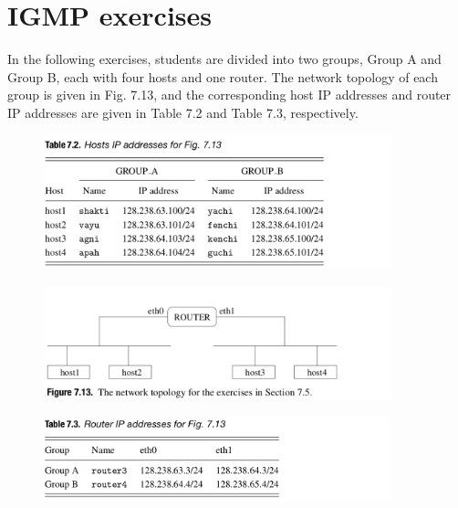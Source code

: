\documentclass[10pt,a4paper]{article}
\numberwithin{equation}{section}
\numberwithin{figure}{section}
\numberwithin{table}{section}
\begin{document}
    \section*{IGMP exercises}
    In the following exercises, students are divided into two groups, Group A and Group B, each with four hosts and one router.
    The network topology of each group is given in Fig.
    7.13, and the corresponding host IP addresses and router IP addresses are given in Table 7.2 and Table 7.3, respectively.
    \begin{figure}[H]
        \centering
        \includegraphics[width=0.9\textwidth]{img/table7-2.png}
    \end{figure}
    \begin{figure}[H]
        \centering
        \includegraphics[width=0.9\textwidth]{img/figure7-13.png}
    \end{figure}
    \begin{figure}[H]
        \centering
        \includegraphics[width=0.9\textwidth]{img/table7-3.png}
    \end{figure}
\end{document}
